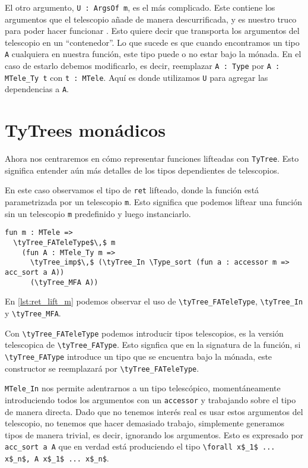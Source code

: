 El otro argumento, \lstinline{U : ArgsOf m}, es el más complicado.
Este contiene los argumentos que el telescopio añade de manera descurrificada, y es nuestro truco para poder hacer funcionar \lift.
Esto quiere decir que transporta los argumentos del telescopio en un ``contenedor''.
Lo que sucede es que cuando encontramos un tipo \lstinline{A} cualquiera en nuestra función, este tipo puede o no estar bajo la mónada.
En el caso de estarlo debemos modificarlo, es decir, reemplazar \lstinline{A : Type} por \lstinline{A : MTele_Ty t} con \lstinline{t : MTele}.
Aquí es donde utilizamos \lstinline{U} para agregar las dependencias a \lstinline{A}.

\section{TyTrees monádicos}

Ahora nos centraremos en cómo representar funciones lifteadas con \lstinline{TyTree}.
Esto significa entender aún más detalles de los tipos dependientes de telescopios.

En este caso observamos el tipo de \lstinline{ret} lifteado, donde la función está parametrizada por un telescopio \lstinline{m}.
Esto significa que podemos liftear una función sin un telescopio \lstinline{m} predefinido y luego instanciarlo.

\begin{lstlisting}[frame=tb,caption={\lstinline{ret} lifteado},label=lst:ret_lift_m]
fun m : MTele =>
  \tyTree_FATeleType$\,$ m
    (fun A : MTele_Ty m =>
      \tyTree_imp$\,$ (\tyTree_In \Type_sort (fun a : accessor m => acc_sort a A))
      (\tyTree_MFA A))
\end{lstlisting}

En \ref{lst:ret_lift_m} podemos observar el uso de \lstinline{\tyTree_FATeleType}, \lstinline{\tyTree_In} y \lstinline{\tyTree_MFA}.

Con \lstinline{\tyTree_FATeleType} podemos introducir tipos telescopios, es la versión telescopica de \lstinline{\tyTree_FAType}. Esto signfica que en la signatura de la función, si \lstinline{\tyTree_FAType} introduce un tipo que se encuentra bajo la mónada, este constructor se reemplazará por \lstinline{\tyTree_FATeleType}.

\lstinline{MTele_In} nos permite adentrarnos a un tipo telescópico, momentáneamente introduciendo todos los argumentos con un \lstinline{accessor} y trabajando sobre el tipo de manera directa.
Dado que no tenemos interés real es usar estos argumentos del telescopio, no tenemos que hacer demasiado trabajo, simplemente generamos tipos de manera trivial, es decir, ignorando los argumentos. Esto es expresado por \lstinline{acc_sort a A} que en verdad está produciendo el tipo \lstinline{\forall x$_1$ ... x$_n$, A x$_1$ ... x$_n$}.

